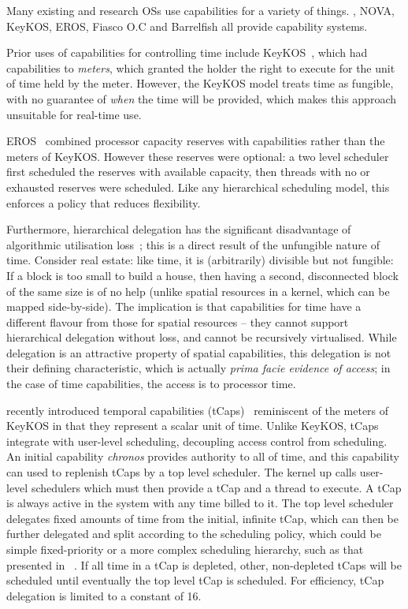 Many existing and research \glspl{OS} use capabilities for a variety of things. \composite, NOVA,
KeyKOS, EROS, Fiasco O.C and Barrelfish all provide capability systems. 

Prior uses of capabilities for controlling time include
KeyKOS~\citep{Bomberger_FFHLS_92}, which had capabilities to \emph{meters}, which granted the holder
the right to execute for the unit of time held by the meter.
However, the KeyKOS model treats time as fungible, with no guarantee
of \emph{when} the time will be provided, which makes this approach
unsuitable for real-time use.

EROS~\citep{Shapiro_SF_99} combined processor capacity reserves with capabilities rather than the
meters of KeyKOS. However these reserves were optional: a two level scheduler first
scheduled the reserves with available capacity, then threads with no
or exhausted reserves were scheduled.
Like any hierarchical scheduling model, this enforces a policy that
reduces flexibility.

Furthermore, hierarchical delegation has the significant disadvantage
of algorithmic utilisation loss~\citep{Lackorzynski_WVH_12}; this is a
direct result of the unfungible nature of time. Consider real
estate: like time, it is (arbitrarily) divisible but not fungible: If
a block is too small to build a house, then having a second,
disconnected block of the same size is of no help (unlike spatial resources in a kernel, which can
be mapped side-by-side). The implication is
that capabilities for time have a different flavour from those for
spatial resources -- they cannot support hierarchical delegation
without loss, and cannot be recursively virtualised. While delegation is an
attractive property of spatial capabilities,
this delegation is not their defining characteristic, which is actually
\emph{prima facie evidence of access}; in the case of time
capabilities, the access is to processor time.

\composite recently introduced temporal capabilities
(tCaps)~\citep{Gadepalli_GBKP_17} reminiscent of
the meters of KeyKOS in that they represent a scalar unit of time.
Unlike KeyKOS, tCaps integrate with user-level scheduling, decoupling access control
from scheduling. An initial capability \emph{chronos} provides authority to all of time, and this capability
can used to replenish tCaps by a top level scheduler. The kernel up calls user-level schedulers 
which must then provide a tCap and a thread to execute. A tCap is always active in the system with
any time billed to it. The top level scheduler delegates fixed amounts of time from the initial,
infinite tCap, which can then be further delegated and split according to the scheduling policy,
which could be simple fixed-priority or a more complex scheduling hierarchy, such as that presented
in \hires~\citep{Parmer_West_11}. If all time
in a tCap is depleted, other, non-depleted tCaps will be scheduled until eventually the top level
tCap is scheduled. For efficiency, tCap delegation is limited to a constant of 16. 

